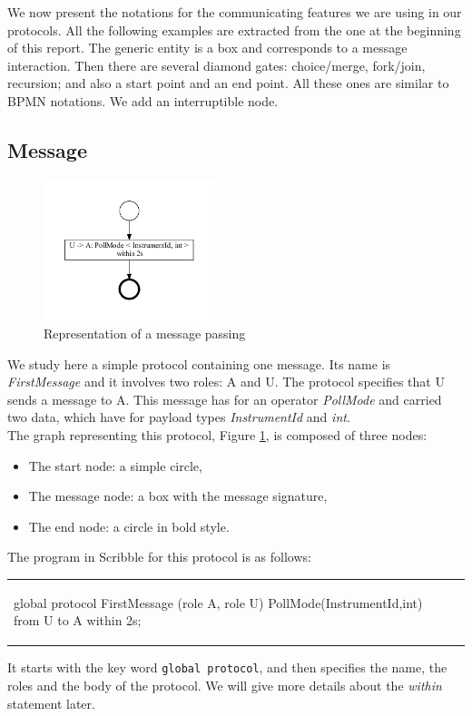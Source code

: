 \documentclass[a4paper,11pt,twoside]{report}
\begin{document}
We now present the notations for the communicating features we are using in our protocols. All the following examples are extracted from the one at the beginning of this report. The generic entity is a box and corresponds to a message interaction. Then there are several diamond gates: choice/merge, fork/join, recursion; and also a start point and an end point. All these ones are similar to BPMN notations. We add an interruptible node.

\subsection{Message}
\begin{figure}[h]
\begin{center}
\includegraphics[width=5cm]{Message}\caption{Representation of a message passing}\label{fig:Msg}
\end{center}
\end{figure}
We study here a simple protocol containing one message. Its name is \emph{FirstMessage} and it involves two roles: A and U. The protocol specifies that U sends a message to A. This message has for an operator \emph{PollMode} and carried two data, which have for payload types \emph{InstrumentId} and \emph{int}.\\
The graph representing this protocol, Figure \ref{fig:Msg}, is composed of three nodes:
\begin{itemize}
\item The start node: a simple circle,
\item The message node: a box with the message signature,
\item The end node: a circle in bold style.
\end{itemize}
The program in Scribble for this protocol is as follows:
\begin{center}
\begin{tabular}{ll}
\begin{SJLISTING}
global protocol FirstMessage (role A, role U) {
	PollMode(InstrumentId,int) from U to A within 2s;
}
\end{SJLISTING}&\\
\end{tabular}
\end{center}
It starts with the key word \texttt{global protocol}, and then specifies the name, the roles and the body of the protocol. We will give more details about the \emph{within} statement later.
\end{document}
